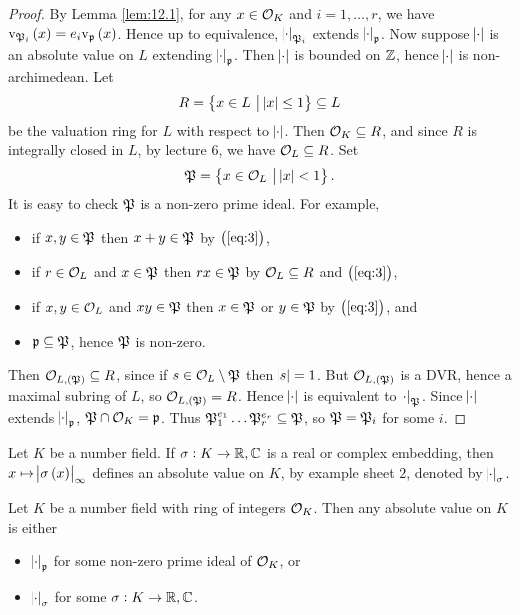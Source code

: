 \begin{proof}
By Lemma \ref{lem:12.1}, for any $ x \in \mathcal{O}_K $ and $ i = 1, \dots, r $, we have $ \v_{\pp_i}\br{x} = e_i\v_\ppp\br{x} $. Hence up to equivalence, $ \abs{\cdot}_{\mathfrak{P}_i} $ extends $ \abs{\cdot}_{\mathfrak{p}} $. Now suppose $ \abs{\cdot} $ is an absolute value on $ L $ extending $ \abs{\cdot}_{\mathfrak{p}} $. Then $ \abs{\cdot} $ is bounded on $ \mathbb{Z} $, hence $ \abs{\cdot} $ is non-archimedean. Let
$$ R = \cbr{x \in L \st \abs{x} \le 1} \subseteq L $$
be the valuation ring for $ L $ with respect to $ \abs{\cdot} $. Then $ \mathcal{O}_K \subseteq R $, and since $ R $ is integrally closed in $ L $, by lecture $ 6 $, we have $ \mathcal{O}_L \subseteq R $. Set
\begin{equation}
\label{eq:3}
\pp = \cbr{x \in \OOO_L \st \abs{x} < 1}.
\end{equation}
It is easy to check $ \mathfrak{P} $ is a non-zero prime ideal. For example,
\begin{itemize}
\item if $ x, y \in \mathfrak{P} $ then $ x + y \in \mathfrak{P} $ by $ \br{\ref{eq:3}} $,
\item if $ r \in \mathcal{O}_L $ and $ x \in \mathfrak{P} $ then $ rx \in \mathfrak{P} $ by $ \mathcal{O}_L \subseteq R $ and $ \br{\ref{eq:3}} $,
\item if $ x, y \in \mathcal{O}_L $ and $ xy \in \mathfrak{P} $ then $ x \in \mathfrak{P} $ or $ y \in \mathfrak{P} $ by $ \br{\ref{eq:3}} $, and
\item $ \mathfrak{p} \subseteq \mathfrak{P} $, hence $ \mathfrak{P} $ is non-zero.
\end{itemize}
Then $ \OOO_{L, \br{\pp}} \subseteq R $, since if $ s \in \mathcal{O}_L \setminus \mathfrak{P} $ then $ \abs{s} = 1 $. But $ \OOO_{L, \br{\pp}} $ is a DVR, hence a maximal subring of $ L $, so $ \OOO_{L, \br{\pp}} = R $. Hence $ \abs{\cdot} $ is equivalent to $ \abs{\cdot}_{\mathfrak{P}} $. Since $ \abs{\cdot} $ extends $ \abs{\cdot}_{\mathfrak{p}} $, $ \mathfrak{P} \cap \mathcal{O}_K = \mathfrak{p} $. Thus $ \mathfrak{P}_1^{e_1} \dots \mathfrak{P}_r^{e_r} \subseteq \mathfrak{P} $, so $ \mathfrak{P} = \mathfrak{P}_i $ for some $ i $.
\end{proof}

Let $ K $ be a number field. If $ \sigma : K \to \mathbb{R}, \mathbb{C} $ is a real or complex embedding, then $ x \mapsto \abs{\sigma\br{x}}_\infty $ defines an absolute value on $ K $, by example sheet $ 2 $, denoted by $ \abs{\cdot}_\sigma $.

\begin{corollary}
Let $ K $ be a number field with ring of integers $ \mathcal{O}_K $. Then any absolute value on $ K $ is either
\begin{itemize}
\item $ \abs{\cdot}_{\mathfrak{p}} $ for some non-zero prime ideal of $ \mathcal{O}_K $, or
\item $ \abs{\cdot}_\sigma $ for some $ \sigma : K \to \mathbb{R}, \mathbb{C} $.
\end{itemize}
\end{corollary}

